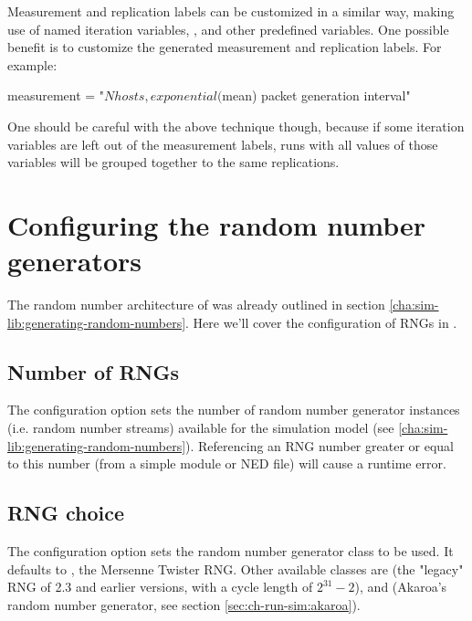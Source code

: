 Measurement and replication labels can be customized in a similar way,
making use of named iteration variables, ,
 and other predefined variables. One possible benefit is
to customize the generated measurement and replication labels. For
example:

\begin{inifile}
measurement = "${N} hosts, exponential(${mean}) packet generation interval"
\end{inifile}

One should be careful with the above technique though, because if some
iteration variables are left out of the measurement labels, runs with
all values of those variables will be grouped together to the same
replications.


\section{Configuring the random number generators}
\label{sec:ch-config-sim:rng-config}

The random number architecture of {\opp} was already outlined
in section \ref{cha:sim-lib:generating-random-numbers}. Here
we'll cover the configuration of RNGs in .

\subsection{Number of RNGs}

The  configuration option sets the number of
random number generator instances (i.e. random number streams)
available for the simulation model (see \ref{cha:sim-lib:generating-random-numbers}).
Referencing an RNG number greater or equal to this number
(from a simple module or NED file) will cause a runtime error.


\subsection{RNG choice}

The  configuration option sets the random number
generator class to be used. It defaults to ,
the Mersenne Twister RNG. Other available classes are 
(the "legacy" RNG of {\opp} 2.3 and earlier versions, with a cycle length
of $2^{31}-2$), and  (Akaroa's random number generator,
see section \ref{sec:ch-run-sim:akaroa}).

